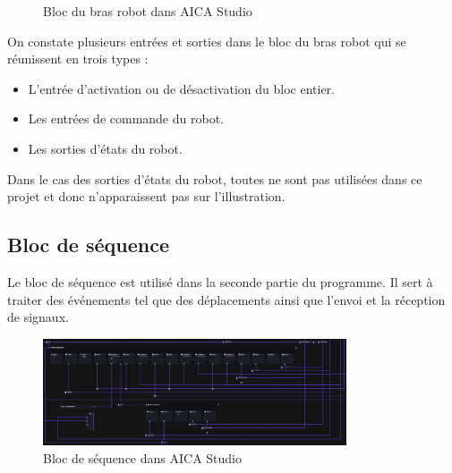 \begin{figure}[H]
    \caption{Bloc du bras robot dans AICA Studio}
    \label{fig:robot_block}
\end{figure}

On constate plusieurs entrées et sorties dans le bloc du bras robot qui se réunissent en trois types :
\begin{itemize}
    \item L'entrée d'activation ou de désactivation du bloc entier.
    \item Les entrées de commande du robot.
    \item Les sorties d'états du robot.
\end{itemize}
Dans le cas des sorties d'états du robot, toutes ne sont pas utilisées dans ce projet et donc n'apparaissent pas sur l'illustration.



\subsection{Bloc de séquence}

Le bloc de séquence est utilisé dans la seconde partie du programme. Il sert à traiter des événements tel que des déplacements ainsi que l'envoi et la réception de signaux.

\begin{figure}[H]
    \centering
    \includegraphics[width=0.8\textwidth]{assets/figures/AICA_Sequence (2).png}
    \caption{Bloc de séquence dans AICA Studio}
    \label{fig:sequence_block}
\end{figure}

